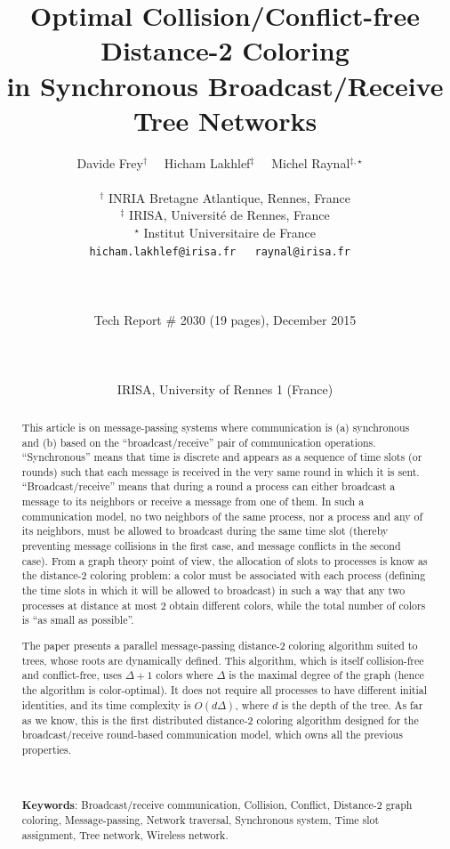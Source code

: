 \documentclass[11pt,english]{article}
\title{\bf  Optimal Collision/Conflict-free Distance-2 Coloring \\
            in  Synchronous  Broadcast/Receive  Tree Networks}
\author{Davide Frey$^{\dag}$~~  
        Hicham Lakhlef$^{\ddag}$~~ 
        Michel Raynal$^{\ddag,\star}$
~\\~\\
$^{\dag}$  INRIA Bretagne Atlantique, Rennes,  France \\
$^{\ddag}$  IRISA, Universit\'e de Rennes,  France \\
$^{\star}$  Institut Universitaire de France\\
{\small{\tt hicham.lakhlef@irisa.fr ~ raynal@irisa.fr}}
~\\~\\~\\
\centerline{Tech Report \# 2030 (19 pages), December 2015}\\
~\\
\centerline{IRISA, University of Rennes 1 (France)}
}
\date{}
\begin{document}
\maketitle

\begin{abstract}
  This article is on message-passing systems where communication is
  (a) synchronous and (b) based on the ``broadcast/receive'' pair of
  communication operations.  ``Synchronous'' means that time is
  discrete and appears as a sequence of time slots (or rounds) such
  that each message is received in the very same round in which it is
  sent.  ``Broadcast/receive'' means that during a round a process can
  either broadcast a message to its neighbors or receive a message
  from one of them.  In such a communication model, no two neighbors
  of the same process, nor a process and any of its neighbors, must be
  allowed to broadcast during the same time slot (thereby preventing
  message collisions in the first case, and message conflicts in the
  second case).  From a graph theory point of view, the allocation of
  slots to processes is know as the distance-2 coloring problem: a
  color must be associated with each process (defining the time slots
  in which it will be allowed to broadcast) in such a way that any two
  processes at distance at most $2$ obtain different colors, while the
  total number of colors is ``as small as possible''.


  The paper presents a parallel message-passing distance-2 coloring
  algorithm suited to trees, whose roots are dynamically defined. This
  algorithm, which is itself collision-free and conflict-free, uses
  $\Delta+1$ colors where $\Delta$ is the maximal degree of the graph
  (hence the algorithm is color-optimal).  It does not require all
  processes to have different initial identities, and its time
  complexity is $O(d\Delta)$, where $d$ is the depth of the tree.  As
  far as we know, this is the first distributed distance-2 coloring
  algorithm designed for the broadcast/receive round-based
  communication model, which owns all the previous properties.

~\\~\\{\bf Keywords}: 
Broadcast/receive communication, Collision, Conflict, 
Distance-2 graph coloring, Message-passing, 
Network traversal, Synchronous system, Time slot assignment,
Tree network, Wireless network. 
\end{abstract}
\end{document}
